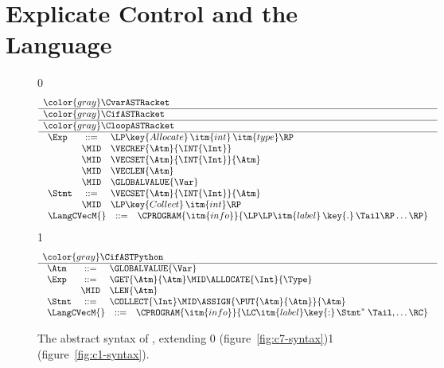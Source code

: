\documentclass[7x10]{TimesAPriori_MIT}%
\newcommand{\gray}[1]{{\color{gray} #1}}
\def\racketEd{0}
\def\pythonEd{1}
\providecommand{\BookEdition}{1}
\let\edition\BookEdition
\newcommand{\racket}[1]{{\if\edition\racketEd{#1}\fi}}
\newcommand{\pythonColor}[0]{}
\newcommand{\python}[1]{{\if\edition\pythonEd\pythonColor #1\fi}}
\numberwithin{theorem}{chapter}
\numberwithin{definition}{chapter}
\numberwithin{equation}{chapter}
\begin{document}
\section{Explicate Control and the \LangCVec{} Language}
\label{sec:explicate-control-r3}


\newcommand{\CtupASTRacket}{
\begin{array}{lcl}
\Exp &::= & \LP\key{Allocate} \,\itm{int}\,\itm{type}\RP \\
   &\MID& \VECREF{\Atm}{\INT{\Int}}  \\
   &\MID& \VECSET{\Atm}{\INT{\Int}}{\Atm} \\
   &\MID& \VECLEN{\Atm} \\
   &\MID& \GLOBALVALUE{\Var} \\
\Stmt &::=& \VECSET{\Atm}{\INT{\Int}}{\Atm} \\
    &\MID& \LP\key{Collect} \,\itm{int}\RP 
\end{array}
}
  
\newcommand{\CtupASTPython}{
\begin{array}{lcl}
\Atm &::=& \GLOBALVALUE{\Var} \\  
\Exp &::=& \GET{\Atm}{\Atm} \MID \ALLOCATE{\Int}{\Type} \\
      &\MID& \LEN{\Atm} \\
\Stmt &::=& \COLLECT{\Int} 
     \MID \ASSIGN{\PUT{\Atm}{\Atm}}{\Atm} 
\end{array}
}

\begin{figure}[tp]
  \begin{tcolorbox}[colback=white]
    \small
{\if\edition\racketEd    
\[
\begin{array}{l}
  \gray{\CvarASTRacket} \\ \hline
  \gray{\CifASTRacket} \\ \hline
  \gray{\CloopASTRacket} \\ \hline
  \CtupASTRacket \\
  \begin{array}{lcl}
    \LangCVecM{} & ::= & \CPROGRAM{\itm{info}}{\LP\LP\itm{label}\,\key{.}\,\Tail\RP\ldots\RP}
  \end{array}
\end{array}
\]
\fi}
{\if\edition\pythonEd\pythonColor
\[
\begin{array}{l}
  \gray{\CifASTPython} \\ \hline
  \CtupASTPython \\
\begin{array}{lcl}
\LangCVecM{} & ::= & \CPROGRAM{\itm{info}}{\LC\itm{label}\key{:}\,\Stmt^{*}\;\Tail, \ldots \RC}
\end{array}
\end{array}
\]
\fi}
  \end{tcolorbox}

\caption{The abstract syntax of \LangCVec{}, extending
  \racket{\LangCLoop{} (figure~\ref{fig:c7-syntax})}\python{\LangCIf{}
  (figure~\ref{fig:c1-syntax})}.}
\label{fig:c2-syntax}
\end{figure}
\end{document}
